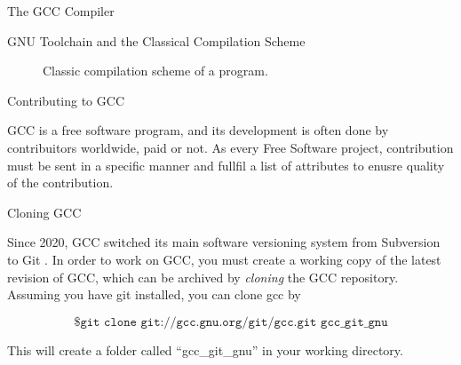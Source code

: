 \begin{section}{The GCC Compiler}
\begin{subsection}{GNU Toolchain and the Classical Compilation Scheme}
\begin{figure}
\begin{center}
{
}
\end{center}
\caption{Classic compilation scheme of a program.}
\label{fig:classical_build}
\end{figure}

\end{subsection}

\begin{section}{Contributing to GCC}\label{sec:contributing}

GCC is a free software program, and its development is often done by
contribuitors worldwide, paid or not. As every Free Software project,
contribution must be sent in a specific manner and fullfil a list
of attributes to enusre quality of the contribution.

\begin{subsection}{Cloning GCC}

Since 2020, GCC switched its main software versioning system from Subversion
to Git \citep{gcc_git}. In order to work on GCC, you must create a working
copy of the latest revision of GCC, which can be archived by \textit{cloning}
the GCC repository. Assuming you have git installed, you can clone
gcc by

$$\texttt{\$ git clone git://gcc.gnu.org/git/gcc.git gcc\_git\_gnu}$$

This will create a folder called ``gcc\_git\_gnu'' in your working directory.


\end{subsection}
\end{section}
\end{section}
